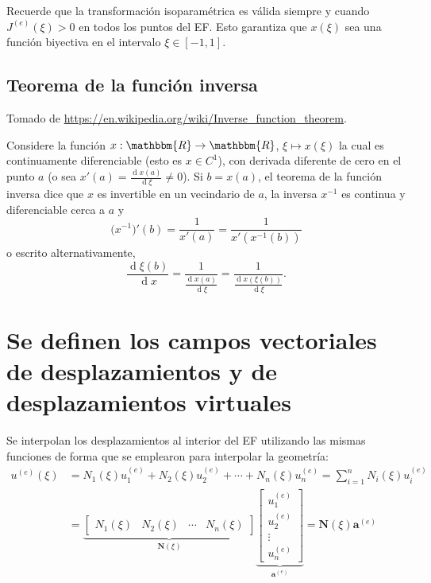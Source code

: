 \documentclass[12pt,letterpaper]{article}
\newcommand{\ve}[1]{{\boldsymbol{#1}}}
\newcommand{\ma}[1]{{\boldsymbol{#1}}}
\newcommand{\dd}{\operatorname{d} \!}
\begin{document}
Recuerde que la transformación isoparamétrica es válida siempre y cuando $J^{(e)}(\xi)>0$ en todos los puntos del EF. Esto garantiza que $x(\xi)$ sea una función biyectiva en el intervalo $\xi\in[-1,1]$.


\subsection*{Teorema de la función inversa}
Tomado de \url{https://en.wikipedia.org/wiki/Inverse_function_theorem}.
 
Considere la función $x:\mathbbm{R} \to \mathbbm{R}$, $\xi \mapsto x(\xi)$ la cual 
es continuamente diferenciable (esto es $x \in C^1$), con derivada diferente de cero en el punto $a$ (o sea  $x'(a) = \frac{\dd x(a)}{\dd \xi} \neq 0$). Si $b = x(a)$, el teorema de la función inversa dice que $x$ es invertible en un vecindario de $a$, la inversa $x^{-1}$ es continua y diferenciable cerca a $a$ y 
\[
\bigl(x^{-1}\bigr)'(b) = \frac{1}{x'(a)} = \frac{1}{x'(x^{-1}(b))}
\]
o escrito alternativamente,
\[
\frac{\dd \xi(b)}{\dd x} = \frac{1}{\frac{\dd x(a)}{\dd \xi}} = \frac{1}{\frac{\dd x(\xi(b))}{\dd \xi}}.
\]

\newpage

\section{Se definen los campos vectoriales de desplazamientos y  de desplazamientos virtuales}
Se interpolan los desplazamientos al interior del EF utilizando las mismas funciones de forma que se emplearon para interpolar la geometría:
\begin{align}
u^{(e)}(\xi) 
&= N_1(\xi) u_1^{(e)} + N_2(\xi) u_2^{(e)} + \cdots + N_n(\xi) u_n^{(e)} 
= \sum_{i=1}^n N_i(\xi) u_i^{(e)} \\
&= 
\underbrace{\begin{bmatrix}
N_1(\xi) & N_2(\xi) & \cdots & N_n(\xi)
\end{bmatrix}}_{\ma{N}(\xi)}
\underbrace{\begin{bmatrix}
   u_1^{(e)} \\ u_2^{(e)} \\ \vdots \\ u_n^{(e)}
   \end{bmatrix}}_{\ma{a}^{(e)}} = \ma{N}(\xi)  \ve{a}^{(e)}
\end{align}
\end{document}
